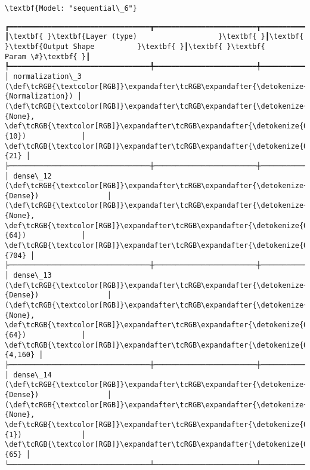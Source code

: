 \documentclass[11pt]{article}
\begin{document}
    
    \begin{Verbatim}[commandchars=\\\{\}]
\textbf{Model: "sequential\_6"}

    \end{Verbatim}

    
    
    \begin{Verbatim}[commandchars=\\\{\}]
┏━━━━━━━━━━━━━━━━━━━━━━━━━━━━━━━━━┳━━━━━━━━━━━━━━━━━━━━━━━━┳━━━━━━━━━━━━━━━┓
┃\textbf{ }\textbf{Layer (type)                   }\textbf{ }┃\textbf{ }\textbf{Output Shape          }\textbf{ }┃\textbf{ }\textbf{      Param \#}\textbf{ }┃
┡━━━━━━━━━━━━━━━━━━━━━━━━━━━━━━━━━╇━━━━━━━━━━━━━━━━━━━━━━━━╇━━━━━━━━━━━━━━━┩
│ normalization\_3 (\def\tcRGB{\textcolor[RGB]}\expandafter\tcRGB\expandafter{\detokenize{0,135,255}}{Normalization}) │ (\def\tcRGB{\textcolor[RGB]}\expandafter\tcRGB\expandafter{\detokenize{0,215,255}}{None}, \def\tcRGB{\textcolor[RGB]}\expandafter\tcRGB\expandafter{\detokenize{0,175,0}}{10})             │            \def\tcRGB{\textcolor[RGB]}\expandafter\tcRGB\expandafter{\detokenize{0,175,0}}{21} │
├─────────────────────────────────┼────────────────────────┼───────────────┤
│ dense\_12 (\def\tcRGB{\textcolor[RGB]}\expandafter\tcRGB\expandafter{\detokenize{0,135,255}}{Dense})                │ (\def\tcRGB{\textcolor[RGB]}\expandafter\tcRGB\expandafter{\detokenize{0,215,255}}{None}, \def\tcRGB{\textcolor[RGB]}\expandafter\tcRGB\expandafter{\detokenize{0,175,0}}{64})             │           \def\tcRGB{\textcolor[RGB]}\expandafter\tcRGB\expandafter{\detokenize{0,175,0}}{704} │
├─────────────────────────────────┼────────────────────────┼───────────────┤
│ dense\_13 (\def\tcRGB{\textcolor[RGB]}\expandafter\tcRGB\expandafter{\detokenize{0,135,255}}{Dense})                │ (\def\tcRGB{\textcolor[RGB]}\expandafter\tcRGB\expandafter{\detokenize{0,215,255}}{None}, \def\tcRGB{\textcolor[RGB]}\expandafter\tcRGB\expandafter{\detokenize{0,175,0}}{64})             │         \def\tcRGB{\textcolor[RGB]}\expandafter\tcRGB\expandafter{\detokenize{0,175,0}}{4,160} │
├─────────────────────────────────┼────────────────────────┼───────────────┤
│ dense\_14 (\def\tcRGB{\textcolor[RGB]}\expandafter\tcRGB\expandafter{\detokenize{0,135,255}}{Dense})                │ (\def\tcRGB{\textcolor[RGB]}\expandafter\tcRGB\expandafter{\detokenize{0,215,255}}{None}, \def\tcRGB{\textcolor[RGB]}\expandafter\tcRGB\expandafter{\detokenize{0,175,0}}{1})              │            \def\tcRGB{\textcolor[RGB]}\expandafter\tcRGB\expandafter{\detokenize{0,175,0}}{65} │
└─────────────────────────────────┴────────────────────────┴───────────────┘

    \end{Verbatim}
\end{document}
